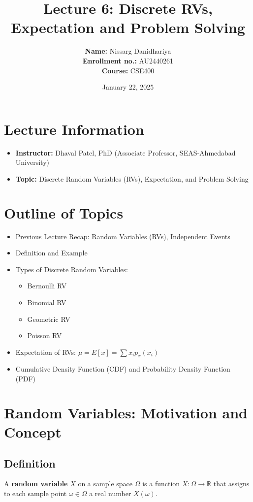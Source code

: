 \documentclass[11pt, a4paper]{article}
\title{\textbf{Lecture 6: Discrete RVs, Expectation and Problem Solving}}
\author{
    \textbf{Name:} Nissarg Danidhariya \\
    \textbf{Enrollment no.:} AU2440261 \\
    \textbf{Course:} CSE400
}
\date{January 22, 2025}
\begin{document}
\maketitle

\section{Lecture Information}
\begin{itemize}
    \item \textbf{Instructor:} Dhaval Patel, PhD (Associate Professor, SEAS-Ahmedabad University)
    \item \textbf{Topic:} Discrete Random Variables (RVs), Expectation, and Problem Solving
\end{itemize}

\section{Outline of Topics}
\begin{itemize}
    \item Previous Lecture Recap: Random Variables (RVs), Independent Events
    \item Definition and Example
    \item Types of Discrete Random Variables:
    \begin{itemize}
        \item Bernoulli RV
        \item Binomial RV
        \item Geometric RV
        \item Poisson RV
    \end{itemize}
    \item Expectation of RVs: $\mu = E[x] = \sum x_i p_x(x_i)$
    \item Cumulative Density Function (CDF) and Probability Density Function (PDF)
\end{itemize}

\section{Random Variables: Motivation and Concept}

\subsection{Definition}
A \textbf{random variable} $X$ on a sample space $\Omega$ is a function $X: \Omega \to \mathbb{R}$ that assigns to each sample point $\omega \in \Omega$ a real number $X(\omega)$.
\end{document}
